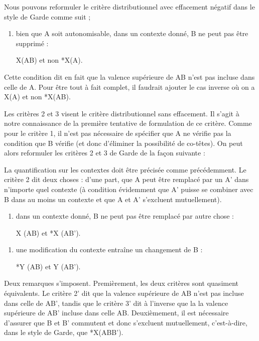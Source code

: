 {   Nous pouvons reformuler le critère distributionnel avec effacement négatif dans le style de Garde comme suit ;
    
    \begin{enumerate}[label=1'.] \item  bien que A soit autonomisable, dans un contexte donné, B ne peut pas être supprimé :
    
    \begin{center}X(AB) et non *X(A).\end{center}
    \end{enumerate}
    
    Cette condition dit en fait que la valence supérieure de AB n'est pas incluse dans celle de A.
    Pour être tout à fait complet, il faudrait ajouter le cas inverse où on a X(A) et non *X(AB).
    
    Les critères 2 et 3 visent le critère distributionnel sans effacement. Il s'agit à notre connaissance de la première tentative de formulation de ce critère. Comme pour le critère 1, il n'est pas nécessaire de spécifier que A ne vérifie pas la condition que B vérifie (et donc d'éliminer la possibilité de co-têtes). On peut alors reformuler les critères 2 et 3 de Garde de la façon suivante :
    
    La quantification sur les contextes doit être précisée comme précédemment. Le critère 2 dit deux choses : d’une part, que A peut être remplacé par un A’ dans n’importe quel contexte (à condition évidemment que A’ puisse se combiner avec B dans au moins un contexte et que A et A' s'excluent mutuellement).
    
    \begin{enumerate}[label=2'.] \item dans un contexte donné, B ne peut pas être remplacé par autre chose :
     \begin{center}X (AB) et *X (AB’).\end{center}\end{enumerate}
    
    \begin{enumerate}[label=3'.] \item une modification du contexte entraîne un changement de B :
     \begin{center}*Y (AB) et Y (AB’).\end{center}\end{enumerate}
   
   Deux remarques s'imposent. Premièrement, les deux critères sont quasiment équivalents. Le critère 2' dit que la valence supérieure de AB n'est pas incluse dans celle de AB', tandis que le critère 3' dit à l'inverse que la la valence supérieure de AB' incluse dans celle AB. Deuxièmement, il est nécessaire d'assurer que B et B' commutent et donc s'excluent mutuellement, c'est-à-dire, dans le style de Garde, que *X(ABB').

}
